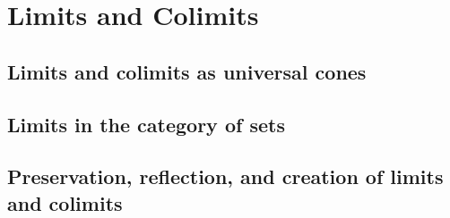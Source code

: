\chapter{Limits and Colimits}

\section{Limits and colimits as universal cones}














\section{Limits in the category of sets}







\section{Preservation, reflection, and creation of limits and colimits}


